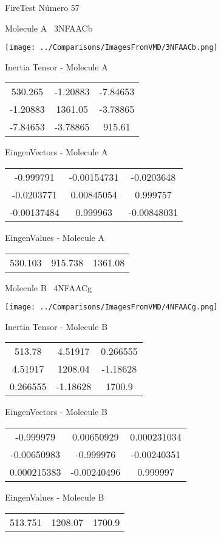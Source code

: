 \vtab[-3cm]
\begin{center}
{\large FireTest \tab Número 57}
\end{center}
\begin{multicols}{2}
\begin{center}

Molecule A \
3NFAACb

\texttt{[image: ../Comparisons/ImagesFromVMD/3NFAACb.png]}

Inertia Tensor - Molecule A \\
\begin{tabular}{|c c c|}
530.265	 & 	-1.20883	 & 	-7.84653	 \\
-1.20883	 & 	1361.05	 & 	-3.78865	 \\
-7.84653	 & 	-3.78865	 & 	915.61
\end{tabular}

\vtab
 EingenVectors - Molecule A     \\
\begin{tabular}{|c c c|}
-0.999791	 & 	-0.00154731	 & 	-0.0203648	 \\
-0.0203771	 & 	0.00845054	 & 	0.999757	 \\
-0.00137484	 & 	0.999963	 & 	-0.00848031
\end{tabular}

\vtab
 EingenValues - Molecule A     \\
\begin{tabular}{|c c c|}
530.103	 & 	915.738	 & 	1361.08	 \\
\end{tabular}
\columnbreak

Molecule B \
4NFAACg

\texttt{[image: ../Comparisons/ImagesFromVMD/4NFAACg.png]}

Inertia Tensor - Molecule B \\
\begin{tabular}{|c c c|}
513.78	 & 	4.51917	 & 	0.266555	 \\
4.51917	 & 	1208.04	 & 	-1.18628	 \\
0.266555	 & 	-1.18628	 & 	1700.9
\end{tabular}

\vtab
 EingenVectors - Molecule B     \\
\begin{tabular}{|c c c|}
-0.999979	 & 	0.00650929	 & 	0.000231034	 \\
-0.00650983	 & 	-0.999976	 & 	-0.00240351	 \\
0.000215383	 & 	-0.00240496	 & 	0.999997
\end{tabular}

\vtab
 EingenValues - Molecule B     \\
\begin{tabular}{|c c c|}
513.751	 & 	1208.07	 & 	1700.9	 \\
\end{tabular}

\end{center}
\end{multicols}


